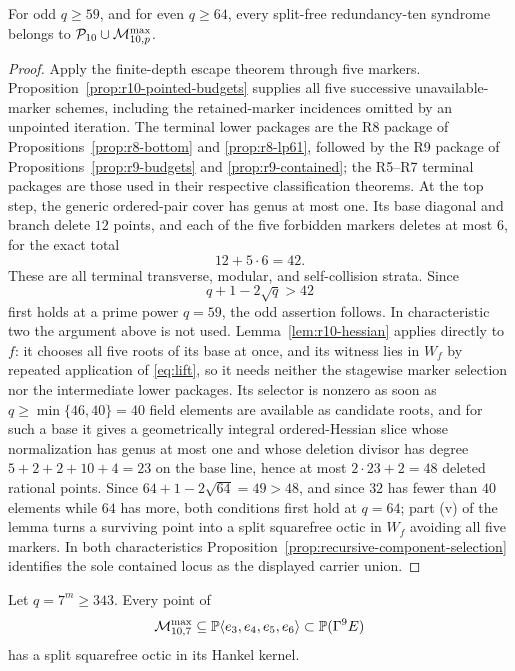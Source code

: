 \begin{proposition}\label{prop:r10-escape}%
%
For odd \(q\geq59\), and for even \(q\geq64\), every split-free
redundancy-ten syndrome belongs to
\(\mathcal P_{10}\cup\mathcal M^{\max}_{10,p}\).
\end{proposition}

\begin{proof}
Apply the finite-depth escape theorem through five markers.
Proposition~\ref{prop:r10-pointed-budgets} supplies all five successive
unavailable-marker schemes, including the retained-marker incidences omitted
by an unpointed iteration.  The terminal lower packages are the R8 package of
Propositions~\ref{prop:r8-bottom} and \ref{prop:r8-lp61}, followed by the
R9 package of Propositions~\ref{prop:r9-budgets} and
\ref{prop:r9-contained}; the R5--R7 terminal packages are those used in
their respective classification theorems.  At the top step, the generic
ordered-pair cover has genus at most one.  Its base diagonal and branch
delete \(12\) points, and each of the five forbidden markers deletes at
most \(6\), for the exact total
\[
                              12+5\cdot6=42.
\]
These are all terminal transverse, modular, and self-collision strata.
Since
\[
                              q+1-2\sqrt q>42
\]
first holds at a prime power \(q=59\), the odd assertion follows.
In characteristic two the argument above is not used.  Lemma~\ref{lem:r10-hessian}
applies directly to $f$: it chooses all five roots of its base at once, and its
witness lies in $W_f$ by repeated application of \eqref{eq:lift}, so it needs
neither the stagewise marker selection nor the intermediate lower packages.
Its selector is nonzero as soon as
$q\geq\min\{46,40\}=40$ field elements are available as candidate roots, and
for such a base it gives a geometrically integral ordered-Hessian slice whose
normalization has genus at most one and whose deletion divisor has degree
$5+2+2+10+4=23$ on the base line, hence at most $2\cdot23+2=48$ deleted
rational points.  Since $64+1-2\sqrt{64}=49>48$, and since $32$ has fewer than
$40$ elements while $64$ has more, both conditions first hold at
$q=64$; part (v) of the lemma turns a surviving point into a split squarefree
octic in $W_f$ avoiding all five markers.  In both characteristics
Proposition~\ref{prop:recursive-component-selection}
identifies the sole contained locus as the displayed carrier union.
\end{proof}

\begin{proposition}
\label{prop:r10-char7-lift}%
%
Let \(q=7^m\geq343\).  Every point of
\[
       \mathcal M^{\max}_{10,7}\subseteq\mathbb P\langle e_3,e_4,e_5,e_6\rangle
       \subset\mathbb P(\Gamma^9E)
\]
has a split squarefree octic in its Hankel kernel.
\end{proposition}

